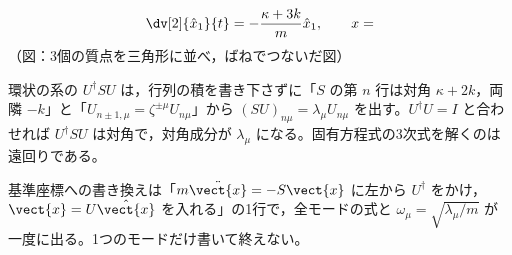 \[
  \dv[2]{\hat{x}_1}{t}=-\frac{\kappa+3k}{m}\hat{x}_1,\qquad x=
\]
（図：3個の質点を三角形に並べ，ばねでつないだ図）
\mikai
\item 環状の系の $U^{\dagger}SU$ は，行列の積を書き下さずに「$S$ の第 $n$ 行は対角 $\kappa+2k$，両隣 $-k$」と「$U_{n\pm1,\mu}=\zeta^{\pm\mu}U_{n\mu}$」から $(SU)_{n\mu}=\lambda_{\mu}U_{n\mu}$ を出す。$U^{\dagger}U=I$ と合わせれば $U^{\dagger}SU$ は対角で，対角成分が $\lambda_{\mu}$ になる。固有方程式の3次式を解くのは遠回りである。
\item 基準座標への書き換えは「$m\ddot{\vect{x}}=-S\vect{x}$ に左から $U^{\dagger}$ をかけ，$\vect{x}=U\hat{\vect{x}}$ を入れる」の1行で，全モードの式と $\omega_{\mu}=\sqrt{\lambda_{\mu}/m}$ が一度に出る。1つのモードだけ書いて終えない。
